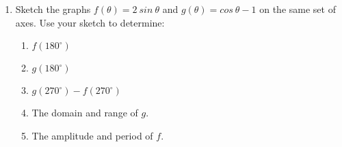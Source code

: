 \begin{eocexercises}{}
\begin{enumerate}[noitemsep, label=\textbf{\arabic*}. ]
  \item Sketch the graphs $f(\theta)=2~ sin~\theta$ and $g(\theta)=cos~\theta-1$ on the same set of axes. Use your sketch to determine:
    \begin{enumerate}[noitemsep, label=\textbf{(\alph*)} ]
    \item $f(180^{\circ})$
    \item $g(180^{\circ})$
    \item $g(270^{\circ}) -f(270^{\circ})$
    \item The domain and range of $g$.
    \item The amplitude and period of $f$.
    \end{enumerate}
  \end{enumerate}


\end{eocexercises}
